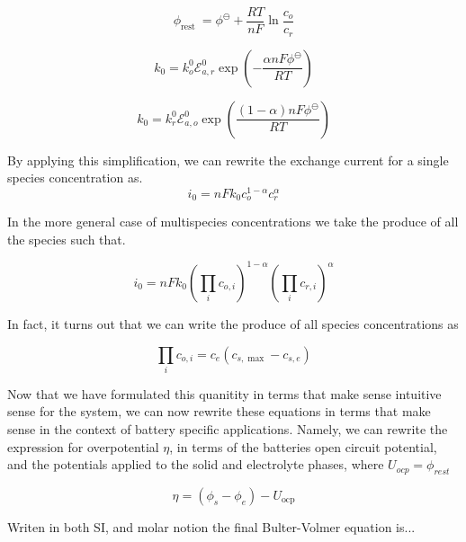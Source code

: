 \documentclass[lettersize,journal]{IEEEtran}
\begin{document}
\begin{equation}
\phi_{\text {rest }} =\phi^{\ominus}+\frac{R T}{n F} \ln \frac{c_{o}}{c_{r}}
\end{equation}



\begin{equation}
k_{0}=k_{o}^{0} \mathscr{E}_{a, r}^{0} \exp \left(-\frac{\alpha n F \phi^{\ominus}}{R T}\right)
\end{equation}

\begin{equation}
  k_{0} =k_{r}^{0} \mathscr{E}_{a, o}^{0} \exp \left(\frac{(1-\alpha) n F \phi^{\ominus}}{R T}\right)
\end{equation}

\noindent By applying this simplification, we can rewrite the exchange current for a single species concentration as.
\begin{equation}
i_{0}=n F k_{0} c_{o}^{1-\alpha} c_{r}^{\alpha}
\end{equation}

\noindent In the more general case of multispecies concentrations we take the produce of all the species such that.

\begin{equation}
i_{0}=n F k_{0}\left(\prod_{i} c_{o, i}\right)^{1-\alpha}\left(\prod_{i} c_{r, i}\right)^{\alpha}
\end{equation}

\noindent In fact, it turns out that we can write the produce of all species concentrations as 

\begin{equation}
\prod_{i} c_{o, i}=c_{e}\left(c_{s, \max }-c_{s, e}\right)
\end{equation}

\noindent Now that we have formulated this quanitity in terms that make sense intuitive sense for the system, we can now rewrite these equations in terms that make sense in the context of battery specific applications. Namely, we can rewrite the expression for overpotential $\eta$, in terms of the batteries open circuit potential, and the potentials applied to the solid and electrolyte phases, where $U_{ocp} = \phi_{rest}$

\begin{equation}
\eta=\left(\phi_{s}-\phi_{e}\right)-U_{\mathrm{ocp}}
\end{equation}

Writen in both SI, and molar notion the final Bulter-Volmer equation is...
\end{document}
